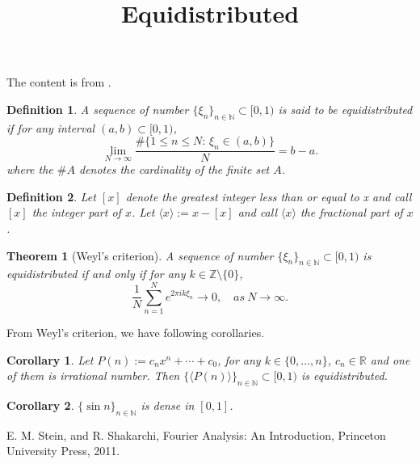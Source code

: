 \documentclass[a4paper,12pt]{article}
\title{Equidistributed}
\author{}
\date{}
\newtheorem{theorem}{Theorem}
\newtheorem{definition}{Definition}
\newtheorem{corollary}{Corollary}
\begin{document}
\maketitle

The content is from \cite[Chapter 4, Section 2]{ss11}.

\begin{definition}
    A sequence of number $ \{ \xi_n \}_{n \in \mathbb{N}} \subset [0, 1) $ is said to be equidistributed 
    if for any interval $ (a, b) \subset [0, 1) $, 
    $$ 
        \lim_{N \to \infty} \frac{ \# \{1 \leq n \leq N: \, \xi_n \in (a, b) \}}{N} = b - a. 
    $$
where the $ \# A $ denotes the cardinality of the finite set $ A $.
\end{definition}

\begin{definition}
    Let $ [x] $ denote the greatest integer less than or equal to x and call $ [x] $ the integer part of $ x $.
    Let $ \langle x \rangle := x - [x] $ and call $ \langle x \rangle $ the fractional part of $ x $.
\end{definition}

\begin{theorem}[Weyl's criterion]
    A sequence of number $ \{ \xi_n \}_{n \in \mathbb{N}} \subset [0, 1) $ is equidistributed 
    if and only if for any $ k \in \mathbb{Z} \setminus \{0\} $,
    $$ 
        \frac{1}{N}\sum_{n=1}^N e^{2 \pi i k \xi_{n}} \to 0, \quad as \ N \to \infty. 
    $$
\end{theorem}

From Weyl's criterion, we have following corollaries.

\begin{corollary}
    Let $ P(n) := c_n x^n + \cdots + c_0 $, for any $ k \in \{0, \ldots, n\} $, $ c_n \in \mathbb{R} $
    and one of them is irrational number. Then $ \{ \langle P(n) \rangle \}_{n \in \mathbb{N}} \subset [0, 1) $ is equidistributed.
\end{corollary}

\begin{corollary}
    $ \{ \sin n \}_{n \in \mathbb{N}} $ is dense in $ [0, 1] $.
\end{corollary}

\begin{thebibliography}{99}

     E. M. Stein, and R. Shakarchi, Fourier Analysis: An Introduction, Princeton University Press, 2011.
    
\end{thebibliography}
\end{document}
